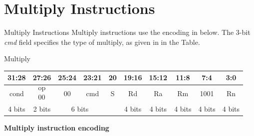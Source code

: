 \documentclass[aspectratio=169]{beamer}
\begin{document}
\section{Multiply Instructions}

\begin{frame}
    \sectionpage
\end{frame}

\begin{frame}{Multiply Instructions}
    \normalsize
    Multiply instructions use the encoding in below.
    The 3-bit \textit{cmd} field specifies the type of multiply, as given in in the Table.
    \vspace{0.5cm}
    \begin{center}
    {\large \textcolor{androidBlue}{Multiply}}
    \end{center}
    
    \begin{center}
    \footnotesize
    \begin{tabular}{|c|c|c|c|c|c|c|c|c|c|}
    \hline
    \multicolumn{1}{|c|}{31:28} & \multicolumn{1}{c|}{27:26} & \multicolumn{1}{c|}{25:24} & 
    \multicolumn{1}{c|}{23:21} & \multicolumn{1}{c|}{20} & \multicolumn{1}{c|}{19:16} & 
    \multicolumn{1}{c|}{15:12} & \multicolumn{1}{c|}{11:8} & \multicolumn{1}{|c|}{7:4} & \multicolumn{1}{c|}{3:0} \\
    \hline
    \textcolor{androidBlue}{cond} & \textcolor{androidBlue}{$\begin{array}{c}\text{op}\\00\end{array}$} & \textcolor{androidBlue}{00} & \textcolor{androidBlue}{cmd} & \textcolor{androidBlue}{S} & \textcolor{androidBlue}{Rd} & \textcolor{androidBlue}{Ra} & \textcolor{androidBlue}{Rm} & \textcolor{androidBlue}{1001} & \textcolor{androidBlue}{Rn}\\
    \hline
    4 bits & 2 bits & \multicolumn{2}{c}{6 bits} & \multicolumn{1}{c|}{} & 4 bits & 4 bits & 4 bits & 4 bits & 4 bits \\
    \cline{1-3}\cline{4-5}\cline{6-10}
    \end{tabular}
    
    \vspace{0.5cm}
    
    \vspace{0.3cm}
    \begin{flushright}
    \textbf{\textcolor{androidBlue}{} Multiply instruction encoding}
    \end{flushright}
    \end{center}
    \end{frame}
    
\end{document}
